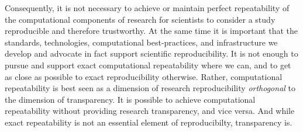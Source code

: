 Consequently, it is not necessary to achieve or 
	maintain perfect repeatability of the computational components of research for scientists to 
	consider a study reproducible and therefore trustworthy.
At the same time it is important that the standards, technologies, 
	computational best-practices, and infrastructure we develop and advocate in fact support scientific reproducibility.
It is not enough to pursue and support exact computational repeatability where we can, and to get as close
	as possible to exact reproducibility otherwise.
Rather, computational repeatability is best seen as a dimension of research reproducibility \emph{orthogonal} to 
	the dimension of transparency.
It is possible to achieve computational repeatability without providing research transparency, and vice versa.
And while exact repeatability is not an essential element of reproducibilty, transparency is.
